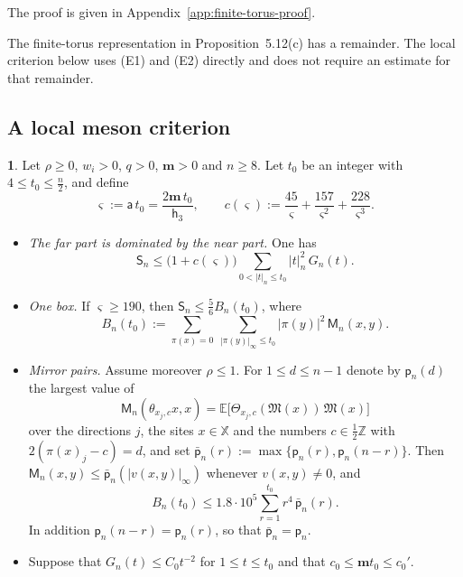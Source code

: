 \documentclass[11pt]{amsart}
\newcommand{\namedhead}{}
\theoremstyle{definition}
\newtheorem*{namedinner}{\namedhead}
\newenvironment{named}[1]{\renewcommand{\namedhead}{#1}\begin{namedinner}}{\end{namedinner}}
\begin{document}
The proof is given in Appendix~\ref{app:finite-torus-proof}.


The finite-torus representation in Proposition~5.12(c) has a remainder.
The local criterion below uses (E1) and (E2) directly and does not require
an estimate for that remainder.

\subsection{A local meson criterion}
\begin{named}{Proposition 5.13}
Let $\rho\ge0$, $w_i>0$, $q>0$, $\mathbf m>0$ and $n\ge8$.
Let $t_0$ be an integer with $4\le t_0\le\frac n2$, and define
\begin{equation*}
\varsigma:=\mathsf a\,t_0=\frac{2\mathbf m\,t_0}{\mathsf h_3},\qquad c(\varsigma):=\frac{45}{\varsigma}+\frac{157}{\varsigma^2}+\frac{228}{\varsigma^3}.
\end{equation*}
\begin{itemize}
\item[(a)] \emph{The far part is dominated by the near part.}
One has
\begin{equation*}
\mathsf S_n\le\bigl(1+c(\varsigma)\bigr)\sum_{0<|t|_n\le t_0}|t|_n^2\,G_n(t).
\end{equation*}
\item[(b)] \emph{One box.}
If $\varsigma\ge190$, then $\mathsf S_n\le\frac56B_n(t_0)$, where
\begin{equation*}
B_n(t_0):=\sum_{\pi(x)=0}\ \sum_{|\pi(y)|_\infty\le t_0}|\pi(y)|^2\,\mathsf M_n(x,y).
\end{equation*}
\item[(c)] \emph{Mirror pairs.}
Assume moreover $\rho\le1$.
For $1\le d\le n-1$ denote by $\mathsf p_n(d)$ the largest value of
\begin{equation*}
\mathsf M_n(\theta_{x_j,c}x,x)=\mathbb E\bigl[\Theta_{x_j,c}(\mathfrak M(x))\,\mathfrak M(x)\bigr]
\end{equation*}
over the directions $j$, the sites $x\in\mathbb X$ and the numbers $c\in\frac12\mathbb Z$ with $2(\pi(x)_j-c)=d$, and set $\bar{\mathsf p}_n(r):=\max\{\mathsf p_n(r),\mathsf p_n(n-r)\}$.
Then $\mathsf M_n(x,y)\le\bar{\mathsf p}_n(|v(x,y)|_\infty)$ whenever $v(x,y)\ne0$, and
\begin{equation*}
B_n(t_0)\le1.8\cdot10^5\sum_{r=1}^{t_0}r^4\,\bar{\mathsf p}_n(r).
\end{equation*}
In addition $\mathsf p_n(n-r)=\mathsf p_n(r)$, so that $\bar{\mathsf p}_n=\mathsf p_n$.
\item[(d)] Suppose that $G_n(t)\le C_0t^{-2}$ for $1\le t\le t_0$ and that $c_0\le\mathbf mt_0\le c_0'$.

\end{itemize}
\end{named}
\end{document}

